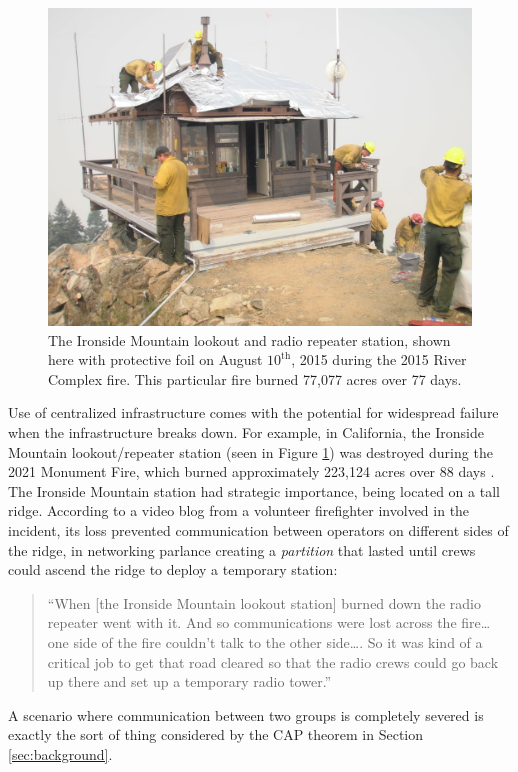 \documentclass[]             %
{NASA}                       %
\theoremstyle{definition}
\begin{document}
\begin{figure}[t]
  \centering
  \includegraphics[scale=0.085]{images/ironside.jpg}
  \caption{The Ironside Mountain lookout and radio repeater station,
    shown here with protective foil on August $10^\textrm{th}$, 2015
    during the 2015 River Complex fire. This particular fire burned
    77,077 acres over 77 days.}
  \label{fig:ironside}
\end{figure}

Use of centralized infrastructure comes with the potential for
widespread failure when the infrastructure breaks down. For example,
in California, the Ironside Mountain lookout/repeater station (seen in
Figure \ref{fig:ironside}) was destroyed during the 2021 Monument
Fire, which burned approximately 223,124 acres over 88 days
\cite{2021:monumentfire}. The Ironside Mountain station had strategic
importance, being located on a tall ridge. According to a video blog
from a volunteer firefighter involved in the incident, its loss
prevented communication between operators on different sides of the
ridge, in networking parlance creating a \emph{partition} that lasted
until crews could ascend the ridge to deploy a temporary station:
\begin{quote}
  ``When {[}the Ironside Mountain lookout station{]} burned down the
  radio repeater went with it. And so communications were lost across
  the fire\ldots{} one side of the fire couldn't talk to the other
  side\ldots.  So it was kind of a critical job to get that road
  cleared so that the radio crews could go back up there and set up a
  temporary radio tower.'' \cite{2022:mechfire}%
\end{quote}
A scenario where communication between two groups is completely
severed is exactly the sort of thing considered by the CAP theorem in
Section \ref{sec:background}.
\end{document}
